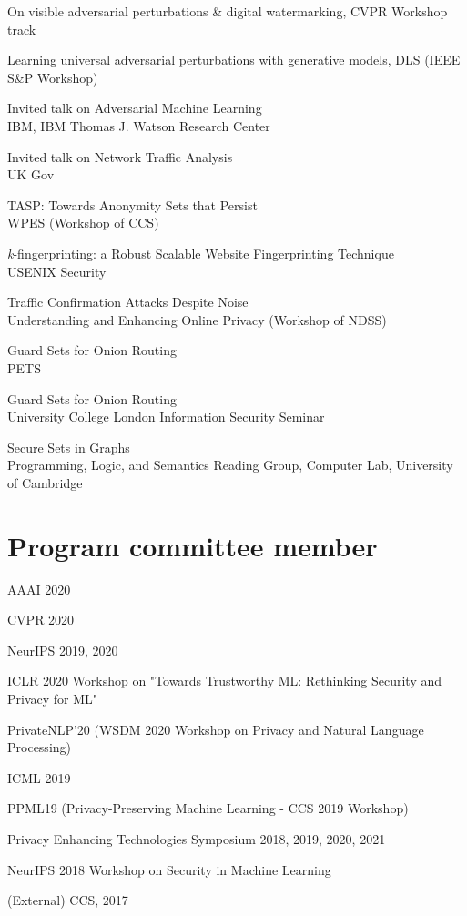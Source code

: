 \documentclass[margin,line]{res}
\begin{document}
\begin{resume}
On visible adversarial perturbations \& digital watermarking,
CVPR Workshop track

Learning universal adversarial perturbations with generative models,
DLS (IEEE S\&P Workshop)

Invited talk on Adversarial Machine Learning\\
IBM, IBM Thomas J. Watson Research Center

Invited talk on Network Traffic Analysis\\
UK Gov

TASP: Towards Anonymity Sets that Persist\\
WPES (Workshop of CCS) 

\emph{k}-fingerprinting: a Robust Scalable Website Fingerprinting
Technique\\
USENIX Security 

Traffic Confirmation Attacks Despite Noise\\
Understanding and Enhancing Online Privacy (Workshop of NDSS)

Guard Sets for Onion Routing\\
PETS 

Guard Sets for Onion Routing\\
University College London Information Security Seminar

Secure Sets in Graphs\\
Programming, Logic, and Semantics Reading Group, Computer Lab, University of Cambridge


\section{\sc Program committee member}

AAAI 2020

CVPR 2020

NeurIPS 2019, 2020

ICLR 2020 Workshop on "Towards Trustworthy ML: Rethinking Security and Privacy for ML"

PrivateNLP'20 (WSDM 2020 Workshop on Privacy and Natural Language Processing)

ICML 2019

 PPML19 (Privacy-Preserving Machine Learning - CCS 2019 Workshop)

Privacy Enhancing Technologies Symposium 2018, 2019, 2020, 2021

NeurIPS 2018 Workshop on Security in Machine Learning

(External) CCS, 2017


\end{resume}
\end{document}
